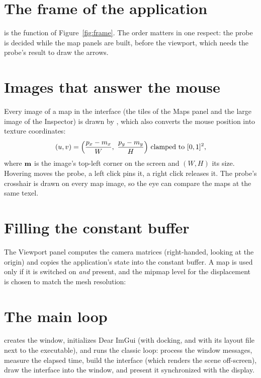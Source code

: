 
\section{The frame of the application}
 is the function of Figure~\ref{fig:frame}. The order matters in one respect:
the probe is decided while the map panels are built, before the viewport, which needs the
probe's result to draw the arrows.


\section{Images that answer the mouse}
Every image of a map in the interface (the tiles of the Maps panel and the large image of the
Inspector) is drawn by , which also converts the mouse position into texture
coordinates:
\[
  (u,v) = \Bigl(\frac{p_x-m_x}{W},\ \frac{p_y-m_y}{H}\Bigr)\ \text{clamped to }[0,1]^2,
\]
where $\mathbf{m}$ is the image's top-left corner on the screen and $(W,H)$ its size. Hovering moves
the probe, a left click pins it, a right click releases it. The probe's crosshair is drawn on
every map image, so the eye can compare the maps at the same texel.


\section{Filling the constant buffer}
The Viewport panel computes the camera matrices (right-handed, looking at the origin) and copies
the application's state into the constant buffer. A map is used only if it is switched on
\emph{and} present, and the mipmap level for the displacement is chosen to match the mesh
resolution:


\section{The main loop}
 creates the window, initializes Dear ImGui (with docking, and with its layout file
next to the executable), and runs the classic loop: process the window messages, measure the
elapsed time, build the interface (which renders the scene off-screen), draw the interface into
the window, and present it synchronized with the display.

